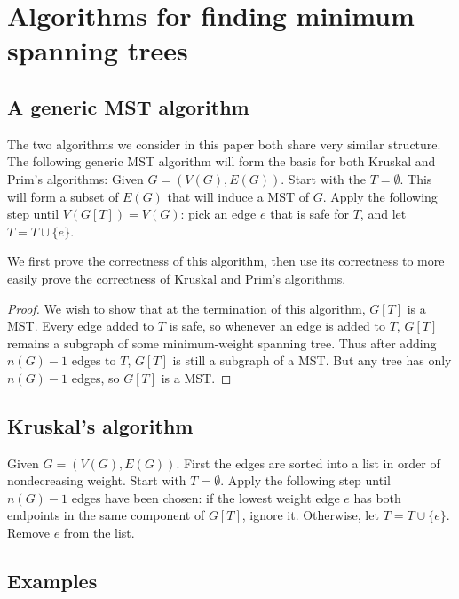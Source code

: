 \documentclass[11pt]{article}
\begin{document}
\section{Algorithms for finding minimum spanning trees}

\subsection{A generic MST algorithm}

The two algorithms we consider in this paper both share very similar structure.
The following generic MST algorithm will form the basis for both Kruskal and Prim's algorithms:
\newline
Given $G=(V(G),E(G))$.
Start with the $T=\emptyset$.
This will form a subset of $E(G)$ that will induce a MST of $G$.
Apply the following step until $V(G[T])=V(G)$: pick an edge $e$ that is safe for $T$, and let $T=T\cup\{e\}$. \cite{CLRS}

We first prove the correctness of this algorithm, then use its correctness to more easily prove the correctness of Kruskal and Prim's algorithms.
\begin{proof}
	We wish to show that at the termination of this algorithm, $G[T]$ is a MST.
	Every edge added to $T$ is safe, so whenever an edge is added to $T$, $G[T]$ remains a subgraph of some minimum-weight spanning tree.
	Thus after adding $n(G)-1$ edges to $T$, $G[T]$ is still a subgraph of a MST.
	But any tree has only $n(G)-1$ edges, so $G[T]$ is a MST.
\end{proof}


\subsection{Kruskal's algorithm}

Given $G=(V(G),E(G))$.
First the edges are sorted into a list in order of nondecreasing weight.
Start with $T=\emptyset$.
Apply the following step until $n(G)-1$ edges have been chosen: if the lowest weight edge $e$ has both endpoints in the same component of $G[T]$, ignore it.
Otherwise, let $T=T\cup\{e\}$.
Remove $e$ from the list. \cite{MST}


\subsection{Examples}

\begin{figure}[H]

\end{figure}
\begin{figure}[H]

\end{figure}
\begin{figure}[H]

\end{figure}
\end{document}
